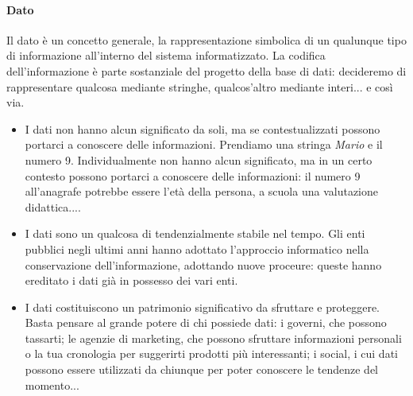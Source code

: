 \paragraph{Dato} Il dato è un concetto generale, la rappresentazione simbolica di un qualunque tipo di informazione all'interno del sistema informatizzato. La codifica dell'informazione è parte sostanziale del progetto della base di dati: decideremo di rappresentare qualcosa mediante stringhe, qualcos'altro mediante interi... e così via.
\begin{itemize}
	\item I dati non hanno alcun significato da soli, ma se contestualizzati possono portarci a conoscere delle informazioni. Prendiamo una stringa \emph{Mario} e il numero 9. Individualmente non hanno alcun significato, ma in un certo contesto possono portarci a conoscere delle informazioni: il numero 9 all'anagrafe potrebbe essere l'età della persona, a scuola una valutazione didattica....
	\item I dati sono un qualcosa di tendenzialmente stabile nel tempo. Gli enti pubblici negli ultimi anni hanno adottato l'approccio informatico nella conservazione dell'informazione, adottando nuove proceure: queste hanno ereditato i dati già in possesso dei vari enti.
	\item I dati costituiscono un patrimonio significativo da sfruttare e proteggere. Basta pensare al grande potere di chi possiede dati: i governi, che possono tassarti; le agenzie di marketing, che possono sfruttare informazioni personali o la tua cronologia per suggerirti prodotti più interessanti; i social, i cui dati possono essere utilizzati da chiunque per poter conoscere le tendenze del momento... 
	
\end{itemize}
